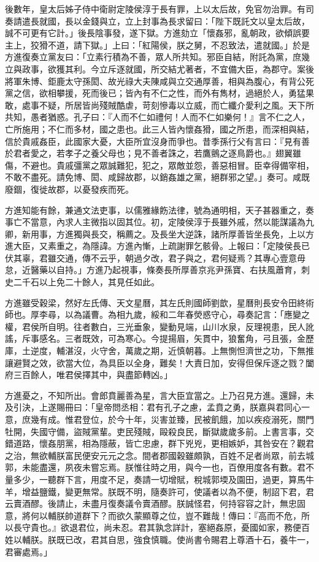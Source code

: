 \begin{pinyinscope}
後數年，皇太后姊子侍中衛尉定陵侯淳于長有罪，上以太后故，免官勿治罪。有司奏請遣長就國，長以金錢與立，立上封事為長求留曰：「陛下既託文以皇太后故，誠不可更有它計。」後長陰事發，遂下獄。方進劾立「懷姦邪，亂朝政，欲傾誤要主上，狡猾不道，請下獄。」上曰：「紅陽侯，朕之舅，不忍致法，遣就國。」於是方進復奏立黨友曰：「立素行積為不善，眾人所共知。邪臣自結，附託為黨，庶幾立與政事，欲獲其利。今立斥逐就國，所交結尤著者，不宜備大臣，為郡守。案後將軍朱博、鉅鹿太守孫閎、故光祿大夫陳咸與立交通厚善，相與為腹心，有背公死黨之信，欲相攀援，死而後已；皆內有不仁之性，而外有雋材，過絕於人，勇猛果敢，處事不疑，所居皆尚殘賊酷虐，苛刻慘毒以立威，而亡纖介愛利之風。天下所共知，愚者猶惑。孔子曰：『人而不仁如禮何！人而不仁如樂何！』言不仁之人，亡所施用；不仁而多材，國之患也。此三人皆內懷姦猾，國之所患，而深相與結，信於貴戚姦臣，此國家大憂，大臣所宜沒身而爭也。昔季孫行父有言曰：『見有善於君者愛之，若孝子之養父母也；見不善者誅之，若鷹鸇之逐鳥爵也。』翅翼雖傷，不避也。貴戚彊黨之眾誠難犯，犯之，眾敵並怨，善惡相冒。臣幸得備宰相，不敢不盡死。請免博、閎、咸歸故郡，以銷姦雄之黨，絕群邪之望。」奏可。咸既廢錮，復徙故郡，以憂發疾而死。

方進知能有餘，兼通文法吏事，以儒雅緣飭法律，號為通明相，天子甚器重之，奏事亡不當意，內求人主微指以固其位。初，定陵侯淳于長雖外戚，然以能謀議為九卿，新用事，方進獨與長交，稱薦之。及長坐大逆誅，諸所厚善皆坐長免，上以方進大臣，又素重之，為隱諱。方進內慚，上疏謝罪乞骸骨。上報曰：「定陵侯長已伏其辜，君雖交通，傳不云乎，朝過夕改，君子與之，君何疑焉？其專心壹意毋怠，近醫藥以自持。」方進乃起視事，條奏長所厚善京兆尹孫寶、右扶風蕭育，刺史二千石以上免二十餘人，其見任如此。

方進雖受穀梁，然好左氏傳、天文星曆，其左氏則國師劉歆，星曆則長安令田終術師也。厚李尋，以為議曹。為相九歲，綏和二年春熒惑守心，尋奏記言：「應變之權，君侯所自明。往者數白，三光垂象，變動見端，山川水泉，反理視患，民人訛謠，斥事感名。三者既效，可為寒心。今提揚眉，矢貫中，狼奮角，弓且張，金歷庫，土逆度，輔湛沒，火守舍，萬歲之期，近慎朝暮。上無惻怛濟世之功，下無推讓避賢之效，欲當大位，為具臣以全身，難矣！大責日加，安得但保斥逐之戮？闔府三百餘人，唯君侯擇其中，與盡節轉凶。」

方進憂之，不知所出。會郎賁麗善為星，言大臣宜當之。上乃召見方進。還歸，未及引決，上遂賜冊曰：「皇帝問丞相：君有孔子之慮，孟賁之勇，朕嘉與君同心一意，庶幾有成。惟君登位，於今十年，災害並臻，民被飢餓，加以疾疫溺死，關門牡開，失國守備，盜賊黨輩。吏民殘賊，毆殺良民，斷獄歲歲多前。上書言事，交錯道路，懷姦朋黨，相為隱蔽，皆亡忠慮，群下兇兇，更相嫉妒，其咎安在？觀君之治，無欲輔朕富民便安元元之念。間者郡國穀雖頗孰，百姓不足者尚眾，前去城郭，未能盡還，夙夜未嘗忘焉。朕惟往時之用，與今一也，百僚用度各有數。君不量多少，一聽群下言，用度不足，奏請一切增賦，稅城郭堧及園田，過更，算馬牛羊，增益鹽鐵，變更無常。朕既不明，隨奏許可，使議者以為不便，制詔下君，君云賣酒醪。後請止，未盡月復奏議令賣酒醪。朕誠怪君，何持容容之計，無忠固意，將何以輔朕帥道群下？而欲久蒙顯尊之位，豈不難哉！傳曰：『高而不危，所以長守貴也。』欲退君位，尚未忍。君其孰念詳計，塞絕姦原，憂國如家，務便百姓以輔朕。朕既已改，君其自思，強食慎職。使尚書令賜君上尊酒十石，養牛一，君審處焉。」


\end{pinyinscope}
